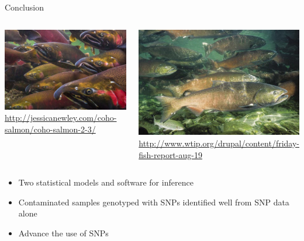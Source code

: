 \documentclass[letter,graphicx]{beamer}
\def\Tiny{\fontsize{3pt}{3pt} \selectfont}
\begin{document}
\begin{frame}{Conclusion}
\begin{columns}[c]
\column{2.5in}
\centering \includegraphics[width=.95\textwidth]{images/conclusion_salmon2.pdf}
\centering \Tiny \url{http://jessicanewley.com/coho-salmon/coho-salmon-2-3/}

\column{2.5in}
\centering \includegraphics[width=.95\textwidth]{images/conclusion_salmon.pdf} 
\centering \Tiny \url{http://www.wtip.org/drupal/content/friday-fish-report-aug-19}
\end{columns}

\begin{itemize}
   \item Two statistical models and software for inference
   \vspace{3mm}
   \item Contaminated samples genotyped with SNPs identified well from SNP data alone
  \vspace{3mm}
   \item Advance the use of SNPs
\end{itemize}
\end{frame}
\end{document}
